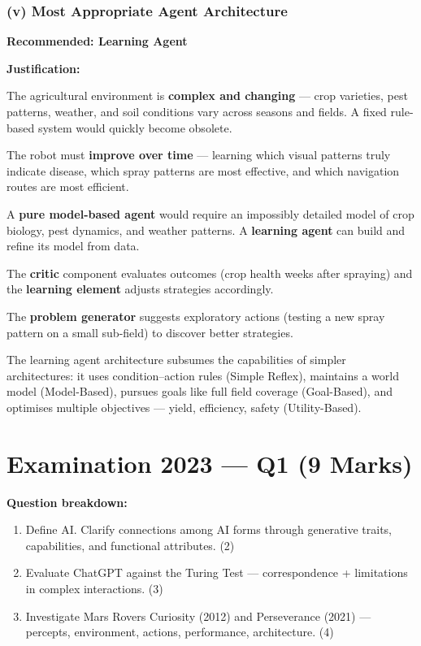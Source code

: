 \documentclass[12pt, a4paper]{article}
\newenvironment{solutionbox}{\begin{mdframed}[style=solutionframe]}{\end{mdframed}}
\newenvironment{answerbox}{\begin{mdframed}[style=answerframe]}{\end{mdframed}}
\begin{document}
\subsubsection*{(v) Most Appropriate Agent Architecture}

\begin{answerbox}
\textbf{Recommended: Learning Agent}

\noindent\textbf{Justification:}
\begin{keypoints}
  \item The agricultural environment is \textbf{complex and changing} — crop varieties, pest patterns, weather, and soil conditions vary across seasons and fields. A fixed rule-based system would quickly become obsolete.
  \item The robot must \textbf{improve over time} — learning which visual patterns truly indicate disease, which spray patterns are most effective, and which navigation routes are most efficient.
  \item A \textbf{pure model-based agent} would require an impossibly detailed model of crop biology, pest dynamics, and weather patterns. A \textbf{learning agent} can build and refine its model from data.
  \item The \textbf{critic} component evaluates outcomes (crop health weeks after spraying) and the \textbf{learning element} adjusts strategies accordingly.
  \item The \textbf{problem generator} suggests exploratory actions (testing a new spray pattern on a small sub-field) to discover better strategies.
\end{keypoints}

\noindent The learning agent architecture subsumes the capabilities of simpler architectures: it uses condition–action rules (Simple Reflex), maintains a world model (Model-Based), pursues goals like full field coverage (Goal-Based), and optimises multiple objectives — yield, efficiency, safety (Utility-Based).
\end{answerbox}

\newpage

\section{Examination 2023 — Q1 (9 Marks)}

\begin{solutionbox}
\textbf{Question breakdown:}
\begin{enumerate}[noitemsep]
  \item[(a)] Define AI. Clarify connections among AI forms through generative traits, capabilities, and functional attributes. (2)
  \item[(b)] Evaluate ChatGPT against the Turing Test — correspondence + limitations in complex interactions. (3)
  \item[(c)] Investigate Mars Rovers Curiosity (2012) and Perseverance (2021) — percepts, environment, actions, performance, architecture. (4)
\end{enumerate}
\end{solutionbox}
\end{document}
